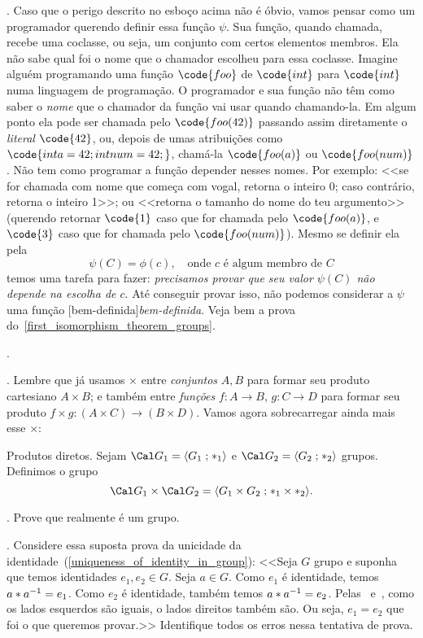 \beware.
\label{not_well_defined_function_danger}%
Caso que o perigo descrito no esboço acima não é óbvio, vamos
pensar como um programador querendo definir essa função $\psi$.
Sua função, quando chamada, recebe uma coclasse, ou seja,
um conjunto com certos elementos membros.
Ela não sabe qual foi o nome que o chamador escolheu para essa
coclasse.
Imagine alguém programando uma função $\code{foo}$
de $\code{int}$ para $\code{int}$ numa linguagem de programação.
O programador e sua função não têm como saber o \emph{nome}
que o chamador da função vai usar quando chamando-la.
Em algum ponto ela pode ser chamada pelo $\code{foo(42)}$
passando assim diretamente o \emph{literal} $\code{42}$,
ou, depois de umas atribuições como $\code{int a = 42; int num = 42;}$,
chamá-la $\code{foo(a)}$ ou $\code{foo(num)}$.
Não tem como programar a função depender nesses nomes.
Por exemplo:
<<se for chamada com nome que começa com vogal, retorna o inteiro 0;
caso contrário, retorna o inteiro 1>>;
ou
<<retorna o tamanho do nome do teu argumento>>
(querendo retornar $\code{1}$ caso que for chamada pelo $\code{foo(a)}$,
e $\code{3}$ caso que for chamada pelo $\code{foo(num)}$).
\endgraf
Mesmo se definir ela pela
$$
\psi(C) = \phi(c),\quad
\text{onde $c$ é algum membro de $C$}
$$
temos uma tarefa para fazer:
\emph{precisamos provar que seu valor $\psi(C)$ não depende na escolha de $c$}.
Até conseguir provar isso, não podemos considerar a $\psi$ uma função
[bem-definida]\emph{bem-definida}.
Veja bem a prova do~\ref{first_isomorphism_theorem_groups}.

\endsection

\problems.

\blah.
Lembre que já usamos $\times$ entre \emph{conjuntos} $A,B$ para formar seu
produto cartesiano $A \times B$; e também entre \emph{funções} $f : A \to B$,
$g : C \to D$ para formar seu produto
$f \times g : (A\times C) \to (B \times D)$.
Vamos agora sobrecarregar ainda mais esse $\times$:

 Produtos diretos.
Sejam $\cal G_1 = \sset {G_1} {\ast_1}$ e $\cal G_2 = \sset {G_2} {\ast_2}$ grupos.
Definimos o grupo
$$
\cal G_1 \times \cal G_2 = \sset {G_1 \times G_2} {{\ast_1} \times {\ast_2}}.
$$

\problem.
Prove que realmente é um grupo.

\endproblem

\problem.
\label{bust_proof_of_uniqueness_of_identity_in_group}%
Considere essa suposta prova da unicidade da identidade~(\ref{uniqueness_of_identity_in_group}):
\endgraf
<<Seja $G$ grupo e suponha que temos identidades $e_1,e_2 \in G$.
Seja $a\in G$.
Como $e_1$ é identidade, temos $a \ast {a}^{-1} = e_1$.
Como $e_2$ é identidade, também temos $a \ast {a}^{-1} = e_2$.
Pelas ~e~, como os lados esquerdos são iguais, o lados direitos também são.
Ou seja, $e_1 = e_2$ que foi o que queremos provar.>>
\endgraf
Identifique todos os erros nessa tentativa de prova.

